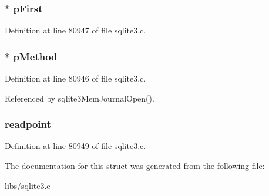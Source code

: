 \hypertarget{struct_mem_journal_a29d3dfeda536231e3b11189539617cb0}{}
\subsubsection[{p\+First}]{$\ast$ p\+First}\label{struct_mem_journal_a29d3dfeda536231e3b11189539617cb0}


Definition at line 80947 of file sqlite3.\+c.

\hypertarget{struct_mem_journal_ae69648ff38966fe9e4e9b75fe8d460bd}{}
\subsubsection[{p\+Method}]{$\ast$ p\+Method}\label{struct_mem_journal_ae69648ff38966fe9e4e9b75fe8d460bd}


Definition at line 80946 of file sqlite3.\+c.



Referenced by sqlite3\+Mem\+Journal\+Open().

\hypertarget{struct_mem_journal_a04600dbe595653d0f08e0ef0e64fdc64}{}
\subsubsection[{readpoint}]{ readpoint}\label{struct_mem_journal_a04600dbe595653d0f08e0ef0e64fdc64}


Definition at line 80949 of file sqlite3.\+c.



The documentation for this struct was generated from the following file\+:\begin{DoxyCompactItemize}
\item 
libs/\hyperlink{sqlite3_8c}{sqlite3.\+c}\end{DoxyCompactItemize}
